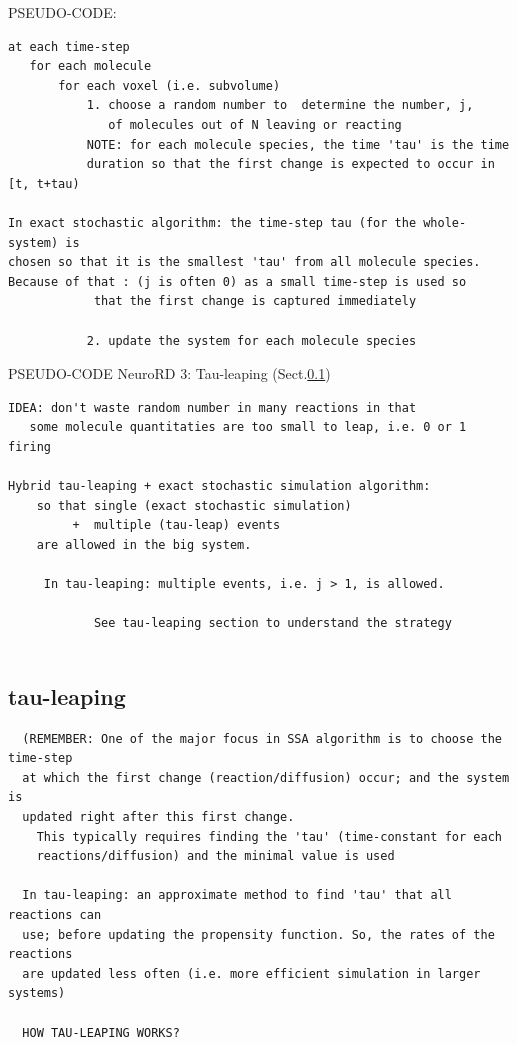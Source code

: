 PSEUDO-CODE:
\begin{verbatim}
at each time-step
   for each molecule
       for each voxel (i.e. subvolume)
           1. choose a random number to  determine the number, j, 
              of molecules out of N leaving or reacting 
           NOTE: for each molecule species, the time 'tau' is the time
           duration so that the first change is expected to occur in [t, t+tau)
           
In exact stochastic algorithm: the time-step tau (for the whole-system) is
chosen so that it is the smallest 'tau' from all molecule species. 
Because of that : (j is often 0) as a small time-step is used so 
            that the first change is captured immediately

           2. update the system for each molecule species 
\end{verbatim}

PSEUDO-CODE NeuroRD 3: Tau-leaping (Sect.\ref{sec:tau-leaping})
\begin{verbatim}
IDEA: don't waste random number in many reactions in that
   some molecule quantitaties are too small to leap, i.e. 0 or 1 firing

Hybrid tau-leaping + exact stochastic simulation algorithm:
    so that single (exact stochastic simulation)
         +  multiple (tau-leap) events 
    are allowed in the big system.
    
     In tau-leaping: multiple events, i.e. j > 1, is allowed.
           
            See tau-leaping section to understand the strategy
            

\end{verbatim}

\subsection{tau-leaping}
\label{sec:tau-leaping}

\begin{verbatim}
  (REMEMBER: One of the major focus in SSA algorithm is to choose the time-step
  at which the first change (reaction/diffusion) occur; and the system is
  updated right after this first change.
    This typically requires finding the 'tau' (time-constant for each
    reactions/diffusion) and the minimal value is used
    
  In tau-leaping: an approximate method to find 'tau' that all reactions can
  use; before updating the propensity function. So, the rates of the reactions 
  are updated less often (i.e. more efficient simulation in larger systems)
  
  HOW TAU-LEAPING WORKS?
\end{verbatim}

